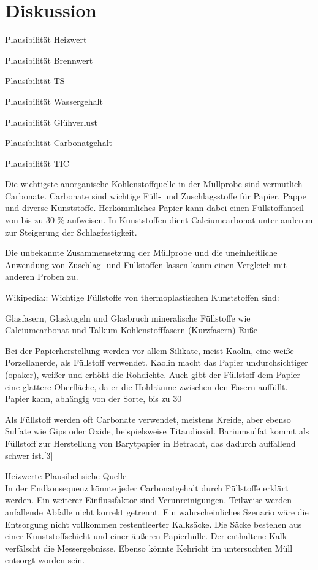 \chapter{Diskussion}
\label{sec:diskussion}

Plausibilität Heizwert

Plausibilität Brennwert

Plausibilität TS

Plausibilität Wassergehalt

Plausibilität Glühverlust

Plausibilität Carbonatgehalt

Plausibilität TIC


Die wichtigste anorganische Kohlenstoffquelle in der Müllprobe sind vermutlich Carbonate.
Carbonate sind wichtige Füll- und Zuschlagsstoffe für Papier, Pappe und diverse Kunststoffe. Herkömmliches Papier kann dabei einen Füllstoffanteil von bis zu 30 \% aufweisen. In Kunststoffen dient Calciumcarbonat unter anderem zur Steigerung der Schlagfestigkeit. 

Die unbekannte Zusammensetzung der Müllprobe und die uneinheitliche Anwendung von Zuschlag- und Füllstoffen lassen kaum einen Vergleich mit anderen Proben zu. 



Wikipedia::
Wichtige Füllstoffe von thermoplastischen Kunststoffen sind:

Glasfasern, Glaskugeln und Glasbruch
mineralische Füllstoffe wie Calciumcarbonat und Talkum
Kohlenstofffasern (Kurzfasern)
Ruße

Bei der Papierherstellung werden vor allem Silikate, meist Kaolin, eine weiße Porzellanerde, als Füllstoff verwendet. Kaolin macht das Papier undurchsichtiger (opaker), weißer und erhöht die Rohdichte. Auch gibt der Füllstoff dem Papier eine glattere Oberfläche, da er die Hohlräume zwischen den Fasern auffüllt. Papier kann, abhängig von der Sorte, bis zu 30 %

Als Füllstoff werden oft Carbonate verwendet, meistens Kreide, aber ebenso Sulfate wie Gips oder Oxide, beispielsweise Titandioxid. Bariumsulfat kommt als Füllstoff zur Herstellung von Barytpapier in Betracht, das dadurch auffallend schwer ist.[3] 

Heizwerte Plausibel siehe Quelle\\

In der Endkonsequenz könnte jeder Carbonatgehalt durch Füllstoffe erklärt werden. Ein weiterer Einflussfaktor sind Verunreinigungen. Teilweise werden anfallende Abfälle nicht korrekt getrennt. Ein wahrscheinliches Szenario wäre die Entsorgung nicht vollkommen restentleerter Kalksäcke. Die Säcke bestehen aus einer Kunststoffschicht und einer äußeren Papierhülle. Der enthaltene Kalk verfälscht die Messergebnisse. Ebenso könnte Kehricht im untersuchten Müll entsorgt worden sein.


